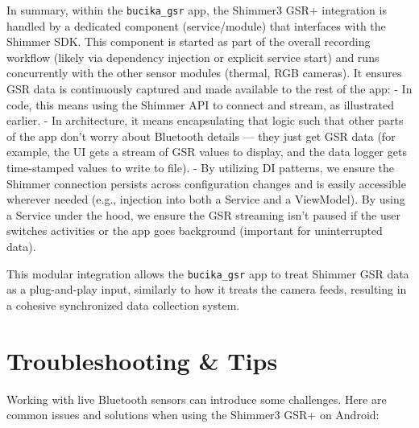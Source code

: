 In summary, within the \texttt{bucika_gsr} app, the Shimmer3 GSR+ integration
is handled by a dedicated component (service/module) that interfaces
with the Shimmer SDK. This component is started as part of the overall
recording workflow (likely via dependency injection or explicit service
start) and runs concurrently with the other sensor modules (thermal, RGB
cameras). It ensures GSR data is continuously captured and made
available to the rest of the app: - In code, this means using the
Shimmer API to connect and stream, as illustrated earlier. - In
architecture, it means encapsulating that logic such that other parts of
the app don't worry about Bluetooth details --- they just get GSR data
(for example, the UI gets a stream of GSR values to display, and the
data logger gets time-stamped values to write to file). - By utilizing
DI patterns, we ensure the Shimmer connection persists across
configuration changes and is easily accessible wherever needed (e.g.,
injection into both a Service and a ViewModel). By using a Service under
the hood, we ensure the GSR streaming isn't paused if the user switches
activities or the app goes background (important for uninterrupted
data).

This modular integration allows the \texttt{bucika_gsr} app to treat Shimmer
GSR data as a plug-and-play input, similarly to how it treats the camera
feeds, resulting in a cohesive synchronized data collection system.

\section{Troubleshooting & Tips}

Working with live Bluetooth sensors can introduce some challenges. Here
are common issues and solutions when using the Shimmer3 GSR+ on Android:

